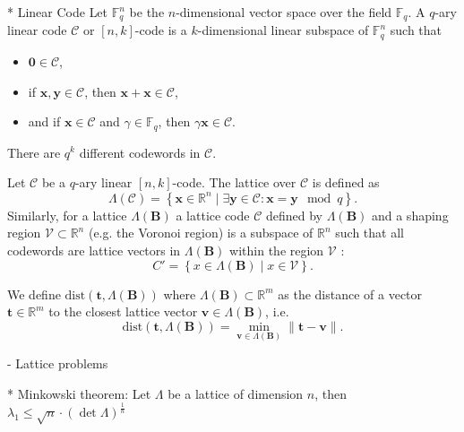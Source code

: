 \documentclass[
  a4paper,  %
  twoside,  %
  bibliography=totoc,
  headsepline,
  cleardoublepage=empty,
  parskip=half,
  draft=false
]{scrbook}
\begin{document}
* Linear Code \cite{VanLint12} %
Let $\mathbb{F}_q^n$ be the $n$-dimensional vector space over the field $\mathbb{F}_q$. A $q$-ary linear code $\mathcal{C}$ or $[n, k]$-code is a $k$-dimensional linear subspace of $\mathbb{F}_q^n$ such that
\begin{itemize}
  \item $\mathbf{0} \in \mathcal{C}$,
  \item if $\mathbf{x}, \mathbf{y} \in \mathcal{C}$, then $\mathbf{x} + \mathbf{x} \in \mathcal{C}$,
  \item and if $\mathbf{x} \in \mathcal{C}$ and $\gamma \in \mathbb{F}_q$, then $\gamma \mathbf{x} \in \mathcal{C}$.
\end{itemize}
There are $q^k$ different codewords in $\mathcal{C}$.

Let $\mathcal{C}$ be a $q$-ary linear $[n, k]$-code. The lattice over $\mathcal{C}$ is defined as %
\begin{equation}
  \Lambda(\mathcal{C}) = \left\{ \mathbf{x} \in \mathbb{R}^n \mid \exists \mathbf{y} \in \mathcal{C} : \mathbf{x} = \mathbf{y} \mod q  \right\}.
\end{equation} %
Similarly, for a lattice $\Lambda(\mathbf{B})$ a lattice code $\mathcal{C}$ defined by $\Lambda(\mathbf{B})$ and a shaping region $\mathcal{V} \subset \mathbb{R}^n$ (e.g. the Voronoi region) is a subspace of $\mathbb{R}^n$ such that all codewords are lattice vectors in $\Lambda(\mathbf{B})$ within the region $\mathcal{V}$ \cite{SFS08}:
\begin{equation}
  C' = \left\{ x \in \Lambda(\mathbf{B}) \mid x \in \mathcal{V} \right\}.
\end{equation} %



We define $\text{dist}(\mathbf{t}, \Lambda(\mathbf{B}))$ where $\Lambda(\mathbf{B}) \subset \mathbb{R}^m$ as the distance of a vector $\mathbf{t} \in \mathbb{R}^m$ to the closest lattice vector $\mathbf{v} \in \Lambda(\mathbf{B})$, i.e.
\begin{equation}\label{eq:dist}
  \text{dist}(\mathbf{t}, \Lambda(\mathbf{B})) = \min_{\mathbf{v} \in \Lambda(\mathbf{B})}\|\mathbf{t} -  \mathbf{v}\|.
\end{equation}




- Lattice problems

* Minkowski theorem: Let $\Lambda$ be a lattice of dimension $n$, then $\lambda_1 \leq \sqrt{n} \cdot (\det \Lambda)^{\frac{1}{n}}$
\end{document}
